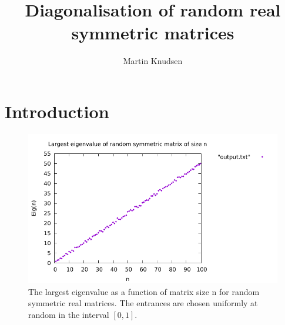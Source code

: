 \documentclass{report}
\author{Martin Knudsen}
\title{Diagonalisation of random real symmetric matrices}
\begin{document}
\maketitle

\section*{Introduction}


\begin{figure}[tbhp]
\includegraphics[width = \textwidth]{Eigenvalue}
\caption{The largest eigenvalue as a function of matrix size n for random symmetric real matrices. The entrances are chosen uniformly at random in the interval $[0, 1]$. \label{fig:eigen}}
\end{figure}


\bgroup
\let\clearpage\relax
\begin{thebibliography}{9}


\end{thebibliography}
\egroup
\end{document}
